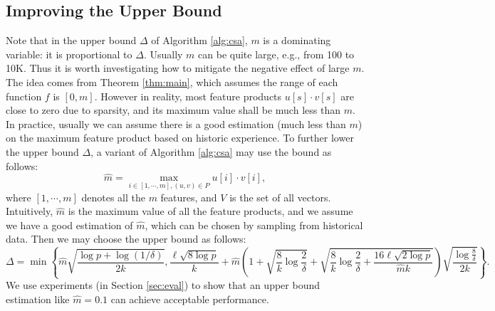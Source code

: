 \documentclass{article}
\begin{document}
\subsection{Improving the Upper Bound}
\label{sec:imprb}
Note that in the upper bound $\Delta$ of Algorithm \ref{alg:csa}, $m$ is a dominating variable: it is proportional to $\Delta$. Usually $m$ can be quite large, e.g., from 100 to 10K. Thus it is worth investigating how to mitigate the negative effect of large $m$. The idea comes from Theorem \ref{thm:main}, which assumes the range of each function $f$ is $[0,m]$. However in reality, most feature products $u[s]\cdot v[s]$ are close to zero due to sparsity, and its maximum value shall be much less than $m$. In practice, usually we can assume there is a good estimation (much less than $m$) on the maximum feature product based on historic experience. To further lower the upper bound $\Delta$, a variant of Algorithm \ref{alg:csa} may use the bound as follows:
$$\hat{m} = \max_{i\in [1,\cdots,m], (u,v) \in P}u[i]\cdot v[i],$$
where $[1,\cdots,m]$ denotes all the $m$ features, and $V$ is the set of all vectors. Intuitively, $\hat{m}$ is the maximum value of all the feature products, and we assume we have a good estimation of $\hat{m}$, which can be chosen by sampling from historical data. 
Then we may choose the upper bound as follows:
$$\Delta = \min\left\{\hat{m}\sqrt{\frac{\log p + \log(1/\delta)}{2k}}, \frac{\ell\sqrt{8\log p}}{k} +\hat{m}\left(1+\sqrt{\frac{8}{k}\log \frac{2}{\delta}} + \sqrt{\frac{8}{k}\log \frac{2}{\delta} + \frac{16\ell\sqrt{2\log p}}{\hat{m}k}}\right)\sqrt{\frac{\log \frac{8}{\delta}}{2k}}\right\}.$$
We use experiments (in Section \ref{sec:eval}) to show that an upper bound estimation like $\hat{m} = 0.1$ can achieve acceptable performance.
\end{document}
